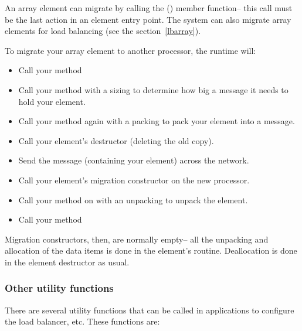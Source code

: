 An array element can migrate by calling the () member function-- this call must be the last action
in an element entry point.  The system can also migrate array elements
for load balancing (see the section~\ref{lbarray}).

To migrate your array element to another processor, the \charmpp{}
runtime will:

\begin{itemize}
\item Call your  method
\item Call your  method with a sizing  to determine how 
big a message it needs to hold your element.
\item Call your  method again with a packing  to pack 
your element into a message.
\item Call your element's destructor (deleting the old copy).
\item Send the message (containing your element) across the network.
\item Call your element's migration constructor on the new processor.
\item Call your  method on with an unpacking  to unpack 
the element.
\item Call your  method
\end{itemize}

Migration constructors, then, are normally empty-- all the unpacking
and allocation of the data items is done in the element's  routine.
Deallocation is done in the element destructor as usual.


\subsubsection{Other utility functions}

There are several utility functions that can be called in applications to
configure the load balancer, etc. These functions are:

